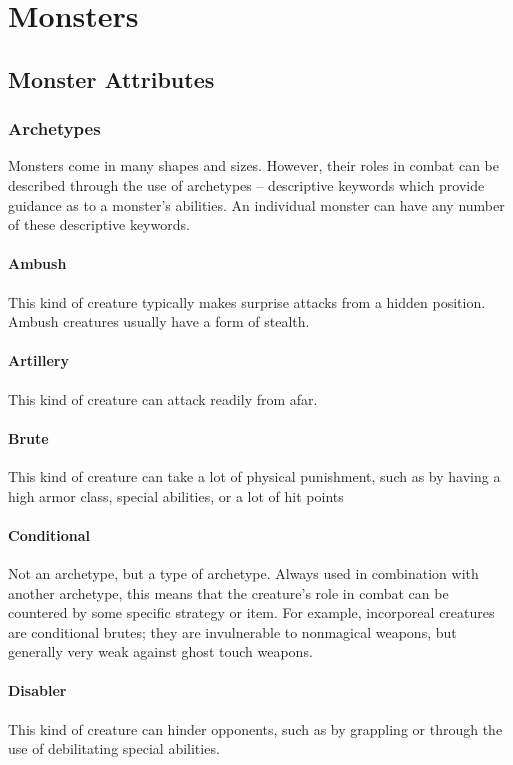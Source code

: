 \chapter{Monsters}

\section{Monster Attributes}

\subsection{Archetypes}

Monsters come in many shapes and sizes. However, their roles in combat can be described through the use of archetypes -- descriptive keywords which provide guidance as to a monster's abilities. An individual monster can have any number of these descriptive keywords.

\subsubsection{Ambush}
This kind of creature typically makes surprise attacks from a hidden position. Ambush creatures usually have a form of stealth.

\subsubsection{Artillery}
This kind of creature can attack readily from afar.

\subsubsection{Brute}
This kind of creature can take a lot of physical punishment, such as by having a high armor class, special abilities, or a lot of hit points

\subsubsection{Conditional}
Not an archetype, but a type of archetype. Always used in combination with another archetype, this means that the creature's role in combat can be countered by some specific strategy or item. For example, incorporeal creatures are conditional brutes; they are invulnerable to nonmagical weapons, but generally very weak against ghost touch weapons.

\subsubsection{Disabler}
This kind of creature can hinder opponents, such as by grappling or through the use of debilitating special abilities.

